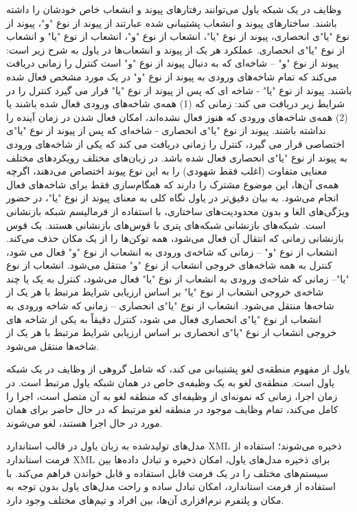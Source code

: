 وظایف در یک شبکه یاول می‌توانند رفتارهای پیوند و انشعاب خاص خودشان را داشته باشند. ساختارهای پیوند و انشعاب پشتیبانی شده عبارتند از پیوند از نوع "و"، پیوند از نوع "یا"ی انحصاری، پیوند از نوع "یا"، انشعاب از نوع "و"، انشعاب از نوع "یا" و انشعاب از نوع "یا"ی انحصاری. عملکرد هر یک از پیوند و انشعاب‌ها در یاول به شرح زیر است:
 پیوند از نوع "و" – شاخه‌ای که به دنبال پیوند از نوع "و" است کنترل را زمانی دریافت می‌کند که تمام شاخه‌های ورودی به پیوند از نوع "و" در یک مورد مشخص فعال شده باشند.
 پیوند از نوع "یا" - شاخه ای که پس از پیوند از نوع "یا" قرار می گیرد کنترل را در شرایط زیر دریافت می کند: زمانی که (1) همه‌ی شاخه‌های ورودی فعال شده باشند یا (2) همه‌ی شاخه‌های ورودی‌ که هنوز فعال نشده‌اند، امکان فعال شدن در زمان آینده را نداشته باشند.
 پیوند از نوع "یا"ی انحصاری - شاخه‌ای که پس از پیوند از نوع "یا"ی اختصاصی قرار می گیرد، کنترل را زمانی دریافت می کند که یکی از شاخه‌های ورودی به پیوند از نوع "یا"ی انحصاری فعال شده باشد.
در زبان‌های مختلف رویکردهای مختلف معنایی متفاوت (اغلب فقط شهودی) را به این نوع پیوند اختصاص می‌دهند، اگرچه همه‌‌ی آن‌ها، این موضوع مشترک را دارند که همگام‌سازی فقط برای شاخه‌های فعال انجام می‌شود.
به بیان دقیق‌تر در یاول نگاه کلی به معنای پیوند از نوع "یا"، در حضور ویژگی‌های الغا و بدون محدودیت‌های ساختاری، با استفاده از فرمالیسم شبکه بازنشانی است. شبکه‌های بازنشانی شبکه‌های پتری با قوس‌های بازنشانی هستند. یک قوس بازنشانی زمانی که انتقال آن فعال می‌شود، همه توکن‌ها را از یک مکان حذف می‌کند.
 انشعاب از نوع "و" – زمانی که شاخه‌ی ورودی به انشعاب از نوع "و" فعال می شود، کنترل به همه شاخه‌های خروجی انشعاب از نوع "و" منتقل می‌شود.
 انشعاب از نوع "یا"– زمانی که شاخه‌ی ورودی به انشعاب از نوع "یا" فعال می‌شود، کنترل به یک یا چند شاخه‌ی خروجی انشعاب از نوع "یا" بر اساس ارزیابی شرایط مرتبط با هر یک از شاخه‌ها منتقل می‌شود.
 انشعاب از نوع "یا"ی انحصاری – زمانی که شاخه ورودی به انشعاب از نوع "یا"ی انحصاری فعال می شود، کنترل دقیقاً به یکی از شاخه های خروجی انشعاب از نوع "یا"ی انحصاری بر اساس ارزیابی شرایط مرتبط با هر یک از شاخه‌ها منتقل می‌شود.

یاول از مفهوم منطقه‌ی لغو پشتیبانی می کند، که شامل گروهی از وظایف در یک شبکه یاول است. منطقه‌ی لغو به یک وظیفه‌ی خاص در همان شبکه یاول مرتبط است. در زمان اجرا، زمانی که نمونه‌ای از وظیفه‌ای که منطقه لغو به آن متصل است، اجرا را کامل می‌کند، تمام وظایف موجود در منطقه لغو مرتبط که در حال حاضر برای همان مورد در حال اجرا هستند، لغو می‌شوند.

مدل‌های تولیدشده به زبان یاول در قالب استاندارد XML ذخیره می‌شوند؛ استفاده از فرمت استاندارد XML برای ذخیره مدل‌های یاول، امکان ذخیره و تبادل داده‌ها بین سیستم‌های مختلف را در یک فرمت قابل استفاده و قابل خواندن فراهم می‌کند. با استفاده از فرمت استاندارد، امکان تبادل ساده و راحت مدل‌های یاول بدون توجه به مکان و پلتفرم نرم‌افزاری آن‌ها، بین افراد و تیم‌های مختلف وجود دارد.

